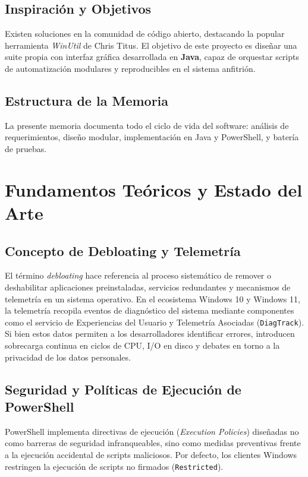 \documentclass[12pt,a4paper]{report}
\begin{document}
\section{Inspiración y Objetivos}
Existen soluciones en la comunidad de código abierto, destacando la popular herramienta \textit{WinUtil} de Chris Titus. El objetivo de este proyecto es diseñar una suite propia con interfaz gráfica desarrollada en \textbf{Java}, capaz de orquestar scripts de automatización modulares y reproducibles en el sistema anfitrión.

\section{Estructura de la Memoria}
La presente memoria documenta todo el ciclo de vida del software: análisis de requerimientos, diseño modular, implementación en Java y PowerShell, y batería de pruebas.

\chapter{Fundamentos Teóricos y Estado del Arte}
\section{Concepto de Debloating y Telemetría}
El término \textit{debloating} hace referencia al proceso sistemático de remover o deshabilitar aplicaciones preinstaladas, servicios redundantes y mecanismos de telemetría en un sistema operativo. En el ecosistema Windows 10 y Windows 11, la telemetría recopila eventos de diagnóstico del sistema mediante componentes como el servicio de Experiencias del Usuario y Telemetría Asociadas (\texttt{DiagTrack}). Si bien estos datos permiten a los desarrolladores identificar errores, introducen sobrecarga continua en ciclos de CPU, I/O en disco y debates en torno a la privacidad de los datos personales.

\section{Seguridad y Políticas de Ejecución de PowerShell}
PowerShell implementa directivas de ejecución (\textit{Execution Policies}) diseñadas no como barreras de seguridad infranqueables, sino como medidas preventivas frente a la ejecución accidental de scripts maliciosos. Por defecto, los clientes Windows restringen la ejecución de scripts no firmados (\texttt{Restricted}). 
\end{document}
